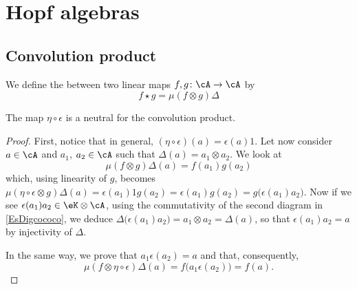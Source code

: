 
\section{Hopf algebras}

\subsection{Convolution product}

We define the  between two linear maps $f,g\colon \cA\to \cA$ by
\begin{equation}
f\star g=\mu(f\otimes g)\Delta
\end{equation}

\begin{lemma}
The map $\eta\circ\epsilon$ is a neutral for the convolution product.
\end{lemma}

 \begin{proof}
First, notice that in general, $(\eta\circ\epsilon)(a)=\epsilon(a)1$. Let now consider $a\in\cA$ and $a_1$, $a_2\in\cA$ such that $\Delta(a)=a_1\otimes a_2$. We look at
\begin{equation} 
  \mu(f\otimes g)\Delta(a)=f(a_1)g(a_2)
\end{equation}
which, using linearity of $g$, becomes $\mu(\eta\circ\epsilon\otimes g)\Delta(a)=\epsilon(a_1)1g(a_2)=\epsilon(a_1)g(a_2)=g\big( \epsilon(a_1)a_2 \big)$. Now if we see $\epsilon(a_1)a_2\in \eK\otimes\cA$, using the commutativity of the second diagram in \eqref{EsDigcococo}, we deduce $\Delta\big( \epsilon(a_1)a_2 \big)=a_1\otimes a_2=\Delta(a)$, so that $\epsilon(a_1)a_2=a$ by injectivity of $\Delta$.

In the same way, we prove that $a_1\epsilon(a_2)=a$ and that, consequently, 
\[ 
  \mu(f\otimes\eta\circ\epsilon)\Delta(a)=f\big( a_1\epsilon(a_2) \big)=f(a).
\]
\end{proof}

